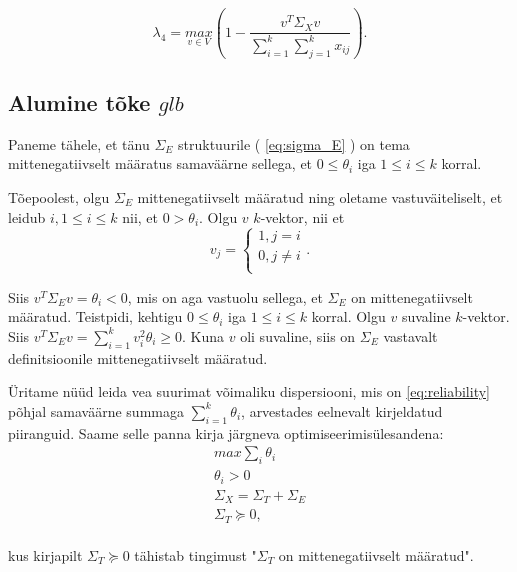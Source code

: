 \documentclass[a4paper,12pt,oneside]{article}
\numberwithin{equation}{section}
\theoremstyle{definition}
\begin{document}
\begin{equation*}
\lambda_4  = \underset{v \in V}{max} \left( 1 - \frac{v^{T} \Sigma_X v}{\sum \limits_{i=1}^k \sum \limits_{j=1}^k x_{ij}} \right).
\end{equation*}


\subsection{Alumine tõke $glb$}


Paneme tähele, et tänu $\Sigma_E$ struktuurile ( \ref{eq:sigma_E} ) on tema mittenegatiivselt määratus samaväärne sellega, et $0 \leq \theta_i$ iga $1 \leq i \leq k$ korral.

Tõepoolest, olgu $\Sigma_E$ mittenegatiivselt määratud ning oletame vastuväiteliselt, et leidub $i, 1 \leq i \leq k$ nii, et $0 > \theta_i $. Olgu $v$ $k$-vektor, nii et
\begin{equation*}
v_j = \begin{cases}
 1, j = i \\
 0, j \neq i \\ 
\end{cases} \text{.}
\end{equation*}

Siis $v^T \Sigma_E v = \theta_i < 0$, mis on aga vastuolu sellega, et $\Sigma_E$ on mittenegatiivselt määratud. Teistpidi, kehtigu $0 \leq \theta_i$ iga $1 \leq i \leq k$ korral. Olgu $v$ suvaline $k$-vektor. Siis $v^T \Sigma_E v = \sum \limits_{i=1}^k v_{i}^{2} \theta_i \geq 0$. Kuna $v$ oli suvaline, siis on $\Sigma_E$ vastavalt definitsioonile mittenegatiivselt määratud.

 

\"Uritame n\"u\"ud  leida vea suurimat võimaliku dispersiooni, mis on \eqref{eq:reliability} põhjal samaväärne summaga $\sum \limits_{i=1}^k \theta_i$, arvestades eelnevalt kirjeldatud piiranguid. Saame selle panna kirja järgneva optimiseerimis\"ulesandena:
\begin{equation}
\begin{gathered}
max \sum_i \theta_i \\
\theta_i > 0 \\
\Sigma_X = \Sigma_T + \Sigma_E \\
\Sigma_T \succeq 0, \\
\end{gathered} 
\end{equation} 

kus kirjapilt $\Sigma_T \succeq 0$ tähistab tingimust "$\Sigma_T$ on mittenegatiivselt määratud". 
\end{document}
